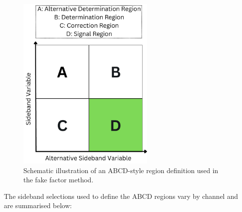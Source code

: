 \begin{figure}[h]
    \centering
    \includegraphics[width=0.6\textwidth]{Figures/Chapter6/ABCD.pdf}
    \caption[ABCD-style region definition for fake factor estimation.]{Schematic illustration of an ABCD-style region definition used in the fake factor method.}
    \label{Figure:Chapter6_ABCD}
\end{figure}

The sideband selections used to define the ABCD regions vary by channel and are summarised below:

